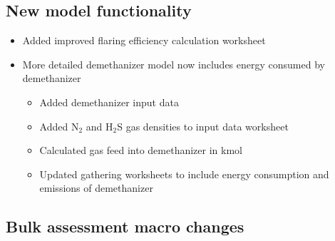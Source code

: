 \documentclass[11pt]{report}
\begin{document}
\subsection{New model functionality}
\begin{itemize}
\item Added improved flaring efficiency calculation worksheet
\item{More detailed demethanizer model now includes energy consumed by demethanizer}
\begin{itemize}
\item{Added demethanizer input data}
\item{Added N$_2$ and H$_2$S gas densities to input data worksheet}
\item{Calculated gas feed into demethanizer in kmol}
\item{Updated gathering worksheets to include energy consumption and emissions of demethanizer}
\end{itemize}
\end{itemize}

\subsection{Bulk assessment macro changes}
\end{document}
